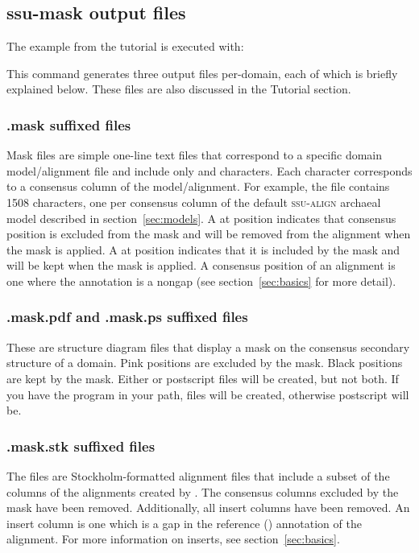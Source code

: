 \subsection{ssu-mask output files}

The  example from the tutorial is executed with:


This command generates three output files per-domain, each of which is
briefly explained below. These files are also discussed in the
Tutorial section. 

\subsubsection{.mask suffixed files}
Mask files are simple one-line text files that correspond to a
specific domain model/alignment file and include only  and
 characters. Each character corresponds to a consensus column
of the model/alignment. For example, the
 file contains 1508 characters, one per
consensus column of the default \textsc{ssu-align} archaeal model
described in section~\ref{sec:models}. A  at position 
indicates that consensus position  is excluded from the mask
and will be removed from the alignment when the mask is applied. A
 at position  indicates that it is included by the
mask and will be kept when the mask is applied. A consensus position
of an alignment is one where the  annotation is a
nongap (see section~\ref{sec:basics} for more detail).

\subsubsection{.mask.pdf and .mask.ps suffixed files}
These are structure diagram files that display a mask on the consensus
secondary structure of a domain. Pink positions are excluded by the
mask. Black positions are kept by the mask. Either  or
postscript  files will be created, but not both. If you have
the program  in your path,  files will be
created, otherwise postscript will be.

\subsubsection{.mask.stk suffixed files}
The  files are Stockholm-formatted alignment files
that include a subset of the columns of the alignments created by
. The consensus columns excluded by the mask have been
removed. Additionally, all insert columns have been removed. An insert
column is one which is a gap in the reference ()
annotation of the alignment. For more information on inserts, see
section~\ref{sec:basics}.

